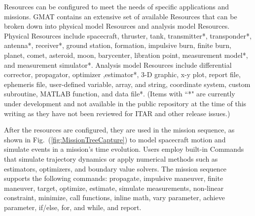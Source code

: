 %
Resources can be configured to meet the needs of specific applications and missions.   GMAT contains an extensive set of available Resources that can be broken down into physical model Resources and analysis model Resources.  Physical Resources include  spacecraft,  thruster, tank, transmitter*, transponder*, antenna*, receiver*, ground station, formation, impulsive burn, finite burn, planet, comet, asteroid, moon, barycenter, libration point, measurement model*,  and measurement simulator*. Analysis model Resources include differential corrector, propagator, optimizer ,estimator*, 3-D graphic, x-y plot, report file, ephemeris file, user-defined variable, array, and string, coordinate system, custom subroutine, MATLAB function, and data file*.  (Items with ``*" are currently under development and not available in the public repository at the time of this writing as they have not been reviewed for ITAR and other release issues.)

After the resources are configured, they are used in the mission sequence, as shown in Fig.~(\ref{fig:MissionTreeCapture}) to model spacecraft motion and simulate events in a mission's time evolution.  Users employ built-in Commands that simulate trajectory dynamics or apply numerical methods such as estimators, optimizers, and boundary value solvers. The mission sequence supports the following commands: propagate, impulsive maneuver, finite maneuver, target, optimize, estimate, simulate measurements, non-linear constraint, minimize, call functions, inline math, vary parameter, achieve parameter,  if/else, for, and while, and report.

